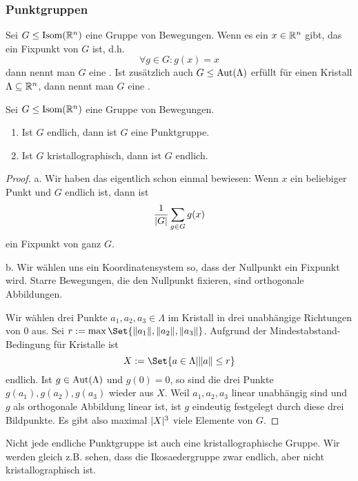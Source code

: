
\subsubsection{Punktgruppen}

\begin{definition}[Punktgruppen]
Sei $G\leq\operatorname{Isom}(\mathbb{R}^n)$ eine Gruppe von Bewegungen. Wenn es ein $x\in\mathbb{R}^n$ gibt, das ein Fixpunkt von $G$ ist, d.h.
\[\forall g\in G: g(x)=x\]
dann nennt man $G$ eine . Ist zusätzlich auch $G\leq\operatorname{Aut}(\Lambda)$ erfüllt für einen Kristall $\Lambda\subseteq\mathbb{R}^n$, dann nennt man $G$ eine .
\end{definition}

\begin{lemma}
Sei $G\leq\operatorname{Isom}(\mathbb{R}^n)$ eine Gruppe von Bewegungen.
\begin{enumerate}
\item Ist $G$ endlich, dann ist $G$ eine Punktgruppe.
\item Ist $G$ kristallographisch, dann ist $G$ endlich.
\end{enumerate}
\end{lemma}
\begin{proof}
a. Wir haben das eigentlich schon einmal bewiesen: Wenn $x$ ein beliebiger Punkt und $G$ endlich ist, dann ist
\[\frac{1}{\lvert G\rvert} \sum_{g\in G} g(x)\]
ein Fixpunkt von ganz $G$.

\medbreak
b. Wir wählen uns ein Koordinatensystem so, dass der Nullpunkt ein Fixpunkt wird. Starre Bewegungen, die den Nullpunkt fixieren, sind orthogonale Abbildungen.

Wir wählen drei Punkte $a_1,a_2,a_3\in\Lambda$ im Kristall in drei unabhängige Richtungen von $0$ aus. Sei $r:=\max\Set{\norm{a_1},\norm{a_2},\norm{a_3}}$. Aufgrund der Mindestabstand-Bedingung für Kristalle ist
\[X:=\Set{a\in\Lambda | \norm{a}\leq r}\]
endlich. Ist $g\in\operatorname{Aut}(\Lambda)$ und $g(0)=0$, so sind die drei Punkte $g(a_1),g(a_2),g(a_3)$ wieder aus $X$. Weil $a_1,a_2,a_3$ linear unabhängig sind und $g$ als orthogonale Abbildung linear ist, ist $g$ eindeutig festgelegt durch diese drei Bildpunkte. Es gibt also maximal $\lvert X\rvert^3$ viele Elemente von $G$.
\end{proof}

\begin{remark}
Nicht jede endliche Punktgruppe ist auch eine kristallographische Gruppe. Wir werden gleich z.B. sehen, dass die Ikosaedergruppe zwar endlich, aber nicht kristallographisch ist.
\end{remark}

